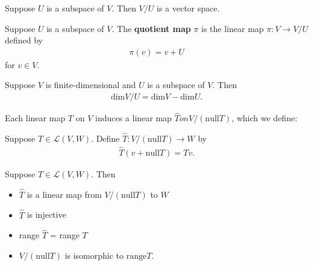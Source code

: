 \documentclass{memoir}
\begin{document}
\begin{thm}
	Suppose $U$ is a subspace of $V$. Then $V / U$ is a vector space.
\end{thm}
\begin{defn}
	Suppose $U$ is a subspace of $V$. The \textbf{quotient map} $\pi$ is the linear map $\pi:V\to V / U$ defined by
	\begin{align*}
		\pi(v) = v + U
	\end{align*}
	for $v \in V$.
\end{defn}
\begin{lemma}
	Suppose $V $ is finite-dimensional and $U$ is a subspace of $V$. Then
	\begin{align*}
		\textrm{dim}V / U = \textrm{dim}V - \textrm{dim}U.
	\end{align*}
\end{lemma}
Each linear map $T$ on $V$ induces a linear map $\hat{T} on V / ( \textrm{null}T)$, which we define:
\begin{defn}
	Suppose $T \in \mathcal{L}(V,W)$. Define $\hat{T}:V / ( \textrm{null}T) \to W$ by
	\begin{align*}
		\hat{T}(v+ \textrm{null}T) = Tv.
	\end{align*}
\end{defn}
\begin{lemma}
	Suppose $T \in  \mathcal{L}(V,W)$. Then
	\begin{itemize}
		\item $\hat{T}$ is a linear map from $V / ( \textrm{null}T)$ to $W$ 
			\item $\hat{T}$ is injective
			\item \textrm{range} $\hat{T}$ = \textrm{range} $T$ 
			\item $V / ( \textrm{null} T)$ is isomorphic to $ \textrm{range} T$.
	\end{itemize}
\end{lemma}
\end{document}
